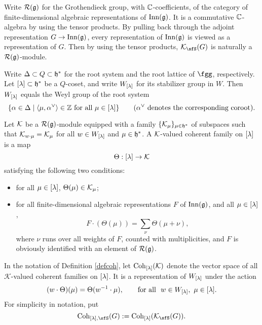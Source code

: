 \documentclass[counting_main.tex]{subfiles}
\begin{document}
Write $\mathcal R(\mathfrak g)$ for the Grothendieck group, with $\mathbb{C}$-coefficients,  of the category of finite-dimensional algebraic representations of $\mathrm{Inn}(\mathfrak g)$. It is a commutative $\mathbb{C}$-algebra by using the tensor products. By pulling back through the adjoint representation $G\rightarrow \mathrm{Inn}(\mathfrak g)$, every representation of $\mathrm{Inn}(\mathfrak g)$ is viewed as a representation of $G$. Then by using the tensor products, $\CK_\sfS(G)$ is naturally a $\mathcal R(\mathfrak g)$-module.






Write $\Delta\subset Q\subset \mathfrak h^*$ for the root system and the root lattice of $\fgg$, respectively. Let ${[\lambda]}\subset \mathfrak h^*$ be a $Q$-coset, and write $W_{[\lambda]}$ for its stabilizer group in $W$. Then $W_{[\lambda]}$ equals the Weyl group of the root system
\[
  \{\alpha \in \Delta\mid \langle \mu, \alpha^\vee\rangle \in \mathbb{Z}\textrm{ for all }\mu\in {[\lambda]}\}\qquad (\alpha^\vee \textrm{ denotes the corresponding coroot}).
\]


\begin{defn}\label{defcoh}
  Let ${\mathcal {K}}$  be a $\mathcal R(\mathfrak g)$-module equipped with a family $\{{\mathcal {K}}_\mu\}_{\mu\in  \mathfrak h^*}$ of subspaces such that ${\mathcal {K}}_{w\cdot \mu}={\mathcal {K}}_\mu$ for all $w\in W_{[\lambda]}$ and $\mu\in \mathfrak h^*$.
  A ${\mathcal {K}}$-valued coherent family on ${[\lambda]}$ is a map
  \[
    \Theta: \Lam\rightarrow \CK%
  \]
  satisfying the following two conditions:
  \begin{itemize}
  \item for all $\mu\in {[\lambda]}$,
    $\Theta(\mu)\in {\mathcal {K}}_\mu$;
  \item for all finite-dimensional algebraic representations $F$ of $\mathrm{Inn}(\mathfrak g)$, and all $\mu\in {[\lambda]}$,
      \[
      F\cdot (\Theta(\mu)) = \sum_{\nu} \Theta(\mu+\nu),
  \]
  where $\nu$ runs over all weights of $F$, counted with multiplicities, and $F$ is obviously identified with an element of $\mathcal R(\mathfrak g)$.
  \end{itemize}
  \end{defn}


In the notation of Definition \ref{defcoh},   let $\mathrm{Coh}_{{[\lambda]}}({\mathcal {K}})$ denote the vector space  of all $\mathcal K$-valued coherent families
  on ${[\lambda]}$. It is a representation of  $W_{{[\lambda]}}$ under the action
  \[
    (w\cdot \Theta)(\mu) = \Theta(w^{-1}\cdot \mu), \qquad \textrm{for all }\  w\in W_{[\lambda]}, \ \mu\in {[\lambda]}.
  \]
For simplicity in notation, put
\[
\Coh_{\Lam,\sfS}(G):=\Coh_{\Lam}(\CK_\sfS(G)).
\]
\end{document}
